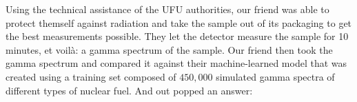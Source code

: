 {{\begin{minipage}[t]{0.45\textwidth}
    Using the technical assistance of the UFU authorities, our friend was able
    to protect themself against radiation and take the sample out of its
    packaging to get the best measurements possible. They let the detector
    measure the sample for 10 minutes, et voil\`{a}: a gamma spectrum of the
    sample. Our friend then took the gamma spectrum and compared it against
    their machine-learned model that was created using a training set composed
    of $450,000$ simulated gamma spectra of different types of nuclear fuel.
    And out popped an answer:
  
  \end{minipage}%
}
  \hfill\vline\hfill
\noindent {}}
